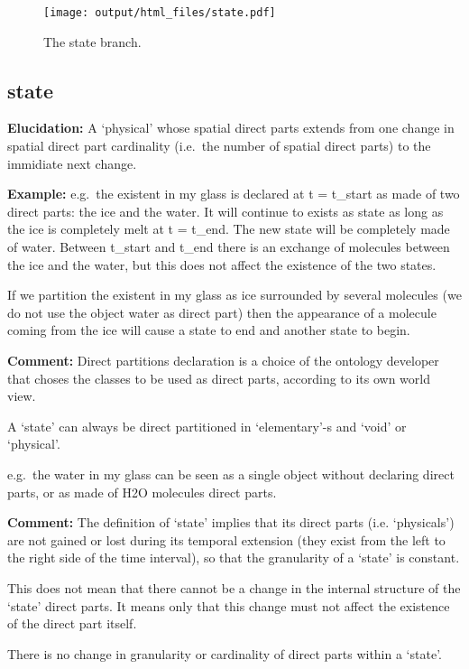 \documentclass[a4paper,]{report}
\begin{document}
\begin{figure}
\centering
\texttt{[image: output/html\_files/state.pdf]}
\caption{The state branch.}
\end{figure}

\hypertarget{state}{%
\subsection{state}\label{state}}

\textbf{Elucidation:} A `physical' whose spatial direct parts extends
from one change in spatial direct part cardinality (i.e.~the number of
spatial direct parts) to the immidiate next change.

\textbf{Example:} e.g.~the existent in my glass is declared at t =
t\_start as made of two direct parts: the ice and the water. It will
continue to exists as state as long as the ice is completely melt at t =
t\_end. The new state will be completely made of water. Between t\_start
and t\_end there is an exchange of molecules between the ice and the
water, but this does not affect the existence of the two states.

If we partition the existent in my glass as ice surrounded by several
molecules (we do not use the object water as direct part) then the
appearance of a molecule coming from the ice will cause a state to end
and another state to begin.

\textbf{Comment:} Direct partitions declaration is a choice of the
ontology developer that choses the classes to be used as direct parts,
according to its own world view.

A `state' can always be direct partitioned in `elementary'-s and `void'
or `physical'.

e.g.~the water in my glass can be seen as a single object without
declaring direct parts, or as made of H2O molecules direct parts.

\textbf{Comment:} The definition of `state' implies that its direct
parts (i.e. `physicals') are not gained or lost during its temporal
extension (they exist from the left to the right side of the time
interval), so that the granularity of a `state' is constant.

This does not mean that there cannot be a change in the internal
structure of the `state' direct parts. It means only that this change
must not affect the existence of the direct part itself.

There is no change in granularity or cardinality of direct parts within
a `state'.
\end{document}
